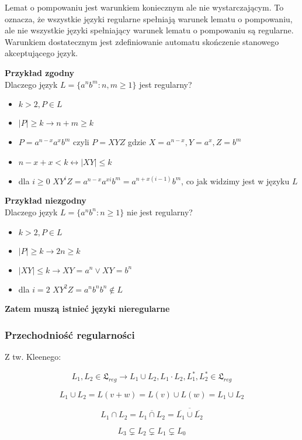 \documentclass{../notatki}
\begin{document}
Lemat o pompowaniu jest warunkiem koniecznym ale nie wystarczającym.
To oznacza, że wszystkie języki regularne spełniają warunek lematu o pompowaniu, ale nie wszystkie języki spełniający warunek lematu o pompowaniu są regularne.
Warunkiem dostatecznym jest zdefiniowanie automatu skończenie stanowego akceptującego język.

\textbf{Przykład zgodny} \\
Dlaczego język $L = \{a^nb^m : n,m \ge 1\}$ jest regularny?

\begin{itemize}
    \item $k > 2, P \in L$
    \item $|P| \ge k \rightarrow n + m \ge k$
    \item $P = a^{n - x}a^xb^m$ czyli $P = XYZ$ gdzie $X = a^{n - x}, Y = a^x, Z = b^m$
    \item $n - x + x < k \leftrightarrow |XY| \le k$
    \item dla $i \ge 0$ $XY^iZ = a^{n - x}a^{xi}b^m = a^{n + x(i - 1)}b^m$, co jak widzimy jest w języku $L$
\end{itemize}
\textbf{Przykład niezgodny} \\
Dlaczego język $L = \{a^nb^n : n \ge 1\}$ nie jest regularny?

\begin{itemize}
    \item $k > 2, P \in L$
    \item $|P| \ge k \rightarrow 2n \ge k$
    \item $|XY| \le k \rightarrow XY = a^n \vee XY = b^n$
    \item dla $i = 2$ $XY^2Z = a^nb^nb^n \notin L$
\end{itemize}
\textbf{Zatem muszą istnieć języki nieregularne}

\subsubsection{Przechodniość regularności}

Z tw. Kleenego:

$$L_1,L_2 \in \mathfrak{L}_{reg} \rightarrow L_1 \cup L_2, L_1 \cdot L_2, L_1^*, L_2^* \in \mathfrak{L}_{reg}$$

$$
L_1 \cup L_2 = L(v + w) = L(v) \cup L(w) = L_1 \cup L_2
$$

$$
L_1 \cap L_2 = \overline{L_1 \cap L_2} = \overline{\overline{L_1} \cup \overline{L_2}}
$$

$$
L_3 \subsetneq L_2 \subsetneq L_1 \subsetneq L_0
$$
\end{document}
